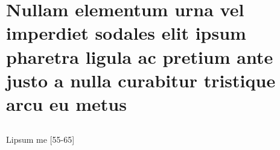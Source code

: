 


\chapter[Nullam elementum urna vel imperdiet]{Nullam elementum urna vel imperdiet sodales elit ipsum pharetra ligula
	ac pretium ante justo a nulla curabitur tristique arcu eu metus}

\showfont
\section[Some encoding tests]{\showfont}
\subsection{\showfont}
\subsubsection{\showfont}
\subsubsubsection{\showfont}



Lipsum me [55-65]


